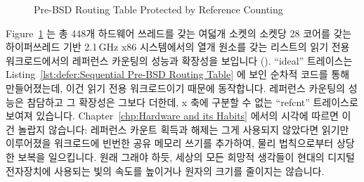 \begin{figure}[tb]
\centering
{}
\caption{Pre-BSD Routing Table Protected by Reference Counting}
\label{fig:defer:Pre-BSD Routing Table Protected by Reference Counting}
\end{figure}

Figure~\ref{fig:defer:Pre-BSD Routing Table Protected by Reference Counting}
는 총 448개 하드웨어 쓰레드를 갖는 여덟개 소켓의 소켓당 28 코어를 갖는
하이퍼쓰레드 기반 2.1\,GHz x86 시스템에서의 열개 원소를 갖는 리스트의 읽기 전용
워크로드에서의 레퍼런스 카운팅의 성능과 확장성을 보입니다
().
``ideal'' 트레이스는
Listing~\ref{lst:defer:Sequential Pre-BSD Routing Table} 에 보인 순차적 코드를
통해 만들어졌는데, 이건 읽기 전용 워크로드이기 때문에 동작합니다.
레퍼런스 카운팅의 성능은 참담하고 그 확장성은 그보다 더한데, x 축에 구분할 수
없는 ``refcnt'' 트레이스로 보여져 있습니다.
Chapter~\ref{chp:Hardware and its Habits} 에서의 시각에 따르면 이건 놀랍지
않습니다:
레퍼런스 카운트 획득과 해제는 그게 사용되지 않았다면 읽기만 이루어졌을
워크로드에 빈번한 공유 메모리 쓰기를 추가하여, 물리 법칙으로부터 상당한 보복을
일으킵니다.
원래 그래야 하듯, 세상의 모든 희망적 생각들이 현대의 디지털 전자장치에 사용되는
빛의 속도를 높이거나 원자의 크기를 줄이지는 않습니다.

\iffalse


